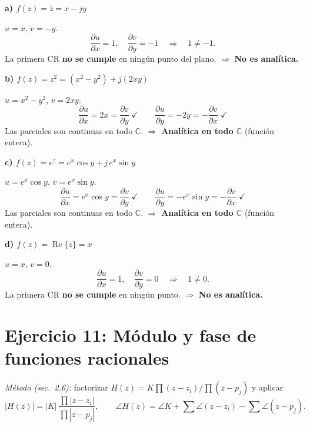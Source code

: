 \documentclass[10pt,a4paper]{article}
\begin{document}
\bigskip

\noindent\textbf{a) $f(z) = \bar{z} = x - jy$}

$u = x$, $v = -y$.
\[
	\frac{\partial u}{\partial x} = 1, \quad
	\frac{\partial v}{\partial y} = -1 \quad\Rightarrow\quad 1 \neq -1.
\]
La primera CR \textbf{no se cumple} en ningún punto del plano. \quad $\Rightarrow$ \textbf{No es analítica.}

\bigskip

\noindent\textbf{b) $f(z) = z^2 = (x^2-y^2) + j(2xy)$}

$u = x^2-y^2$, $v = 2xy$.
\[
	\frac{\partial u}{\partial x} = 2x = \frac{\partial v}{\partial y} \;\checkmark
	\qquad
	\frac{\partial u}{\partial y} = -2y = -\frac{\partial v}{\partial x} \;\checkmark
\]
Las parciales son continuas en todo $\mathbb{C}$. \quad $\Rightarrow$ \textbf{Analítica en todo $\mathbb{C}$} (función entera).

\bigskip

\noindent\textbf{c) $f(z) = e^z = e^x\cos y + j\,e^x\sin y$}

$u = e^x\cos y$, $v = e^x\sin y$.
\[
	\frac{\partial u}{\partial x} = e^x\cos y = \frac{\partial v}{\partial y} \;\checkmark
	\qquad
	\frac{\partial u}{\partial y} = -e^x\sin y = -\frac{\partial v}{\partial x} \;\checkmark
\]
Las parciales son continuas en todo $\mathbb{C}$. \quad $\Rightarrow$ \textbf{Analítica en todo $\mathbb{C}$} (función entera).

\bigskip

\noindent\textbf{d) $f(z) = \operatorname{Re}\{z\} = x$}

$u = x$, $v = 0$.
\[
	\frac{\partial u}{\partial x} = 1, \quad
	\frac{\partial v}{\partial y} = 0 \quad\Rightarrow\quad 1 \neq 0.
\]
La primera CR \textbf{no se cumple} en ningún punto. \quad $\Rightarrow$ \textbf{No es analítica.}

\section*{Ejercicio 11: Módulo y fase de funciones racionales}

\noindent\textit{Método (sec.~2.6):} factorizar $H(z)=K\prod(z-z_i)/\prod(z-p_j)$ y aplicar
\[
	|H(z)| = |K|\,\frac{\prod|z-z_i|}{\prod|z-p_j|}, \qquad
	\angle H(z) = \angle K + \sum\angle(z-z_i) - \sum\angle(z-p_j).
\]

\bigskip
\end{document}
